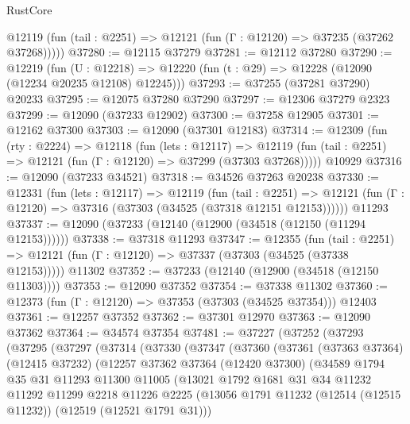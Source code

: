\begin{lexlean}{RustCore}
\begin{coremodule}
      @12119 (fun (tail : @2251) => @12121 (fun (Γ : @12120) => @37235 (@37262 @37268)))))
@37280 := @12115 @37279
@37281 := @12112 @37280
@37290 := @12219
    (fun (U : @12218) => @12220 (fun (t : @29) => @12228 (@12090 (@12234 @20235 @12108) @12245)))
@37293 := @37255 (@37281 @37290) @20233
@37295 := @12075 @37280 @37290
@37297 := @12306 @37279 @2323
@37299 := @12090 (@37233 @12902)
@37300 := @37258 @12905
@37301 := @12162 @37300
@37303 := @12090 (@37301 @12183)
@37314 := @12309
    (fun (rty : @2224) =>
    @12118
      (fun (lets : @12117) =>
      @12119 (fun (tail : @2251) => @12121 (fun (Γ : @12120) => @37299 (@37303 @37268)))))
    @10929
@37316 := @12090 (@37233 @34521)
@37318 := @34526 @37263 @20238
@37330 := @12331
    (fun (lets : @12117) =>
    @12119
      (fun (tail : @2251) =>
      @12121 (fun (Γ : @12120) => @37316 (@37303 (@34525 (@37318 @12151 @12153))))))
    @11293
@37337 := @12090 (@37233 (@12140 (@12900 (@34518 (@12150 (@11294 @12153))))))
@37338 := @37318 @11293
@37347 := @12355
    (fun (tail : @2251) => @12121 (fun (Γ : @12120) => @37337 (@37303 (@34525 (@37338 @12153)))))
    @11302
@37352 := @37233 (@12140 (@12900 (@34518 (@12150 @11303))))
@37353 := @12090 @37352
@37354 := @37338 @11302
@37360 := @12373 (fun (Γ : @12120) => @37353 (@37303 (@34525 @37354))) @12403
@37361 := @12257 @37352
@37362 := @37301 @12970
@37363 := @12090 @37362
@37364 := @34574 @37354
@37481 := @37227
    (@37252
      (@37293
        (@37295
          (@37297
            (@37314
              (@37330
                (@37347
                  (@37360
                    (@37361
                      (@37363 @37364)
                      (@12415 @37232)
                      (@12257
                        @37362
                        @37364
                        (@12420 @37300)
                        (@34589
                          @1794
                          @35
                          @31
                          @11293
                          @11300
                          @11005
                          (@13021
                            @1792
                            @1681
                            @31
                            @34
                            @11232
                            @11292
                            @11299
                            @2218
                            @11226
                            @2225
                            (@13056
                              @1791
                              @11232
                              (@12514 (@12515 @11232))
                              (@12519 (@12521 @1791 @31)))

\end{coremodule}
\end{lexlean}

